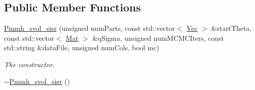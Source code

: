 \subsection*{Public Member Functions}
\begin{DoxyCompactItemize}
\item 
\hyperlink{classPmmh__svol__sisr_ad07ecbdfaccbb26ecefe2f6fd3e2338d}{Pmmh\+\_\+svol\+\_\+sisr} (unsigned num\+Parts, const std\+::vector$<$ \hyperlink{pmfs_8h_a4c7df05c6f5e8a0d15ae14bcdbc07152}{Vec} $>$ \&start\+Theta, const std\+::vector$<$ \hyperlink{pmfs_8h_ae601f56a556993079f730483c574356f}{Mat} $>$ \&q\+Sigma, unsigned num\+M\+C\+M\+C\+Iters, const std\+::string \&data\+File, unsigned num\+Cols, bool mc)
\begin{DoxyCompactList}\small\item\em The constructor. \end{DoxyCompactList}\item 
\hyperlink{classPmmh__svol__sisr_a7e0b043e751ab654c0e7dc25434a2f2a}{$\sim$\+Pmmh\+\_\+svol\+\_\+sisr} ()\hypertarget{classPmmh__svol__sisr_a7e0b043e751ab654c0e7dc25434a2f2a}{}\label{classPmmh__svol__sisr_a7e0b043e751ab654c0e7dc25434a2f2a}


\end{DoxyCompactItemize}
